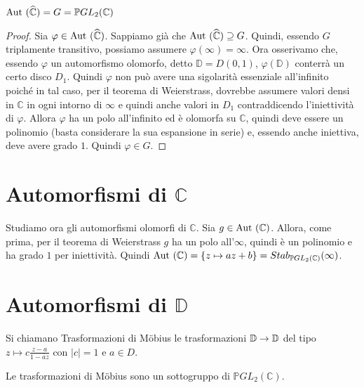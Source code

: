 \begin{proposizione}
$\text{Aut } (\widehat{\mathbb{C}} ) = G = \mathbb{P}GL_2 (\mathbb{C} )$
\end{proposizione}
\begin{proof}
Sia $\varphi \in \text{Aut } (\widehat{\mathbb{C}} )$. Sappiamo già che $\text{Aut } (\widehat{\mathbb{C}} ) \supseteq G$.
Quindi, essendo $G$ triplamente transitivo, possiamo assumere $\varphi( \infty ) = \infty$.
	Ora osserivamo che, essendo $\varphi$ un automorfismo olomorfo, detto $\mathbb{D} = D(0,1)$, $\varphi (\mathbb{D})$ conterrà
un certo disco $D_1$. Quindi $\varphi$ non può avere una sigolarità essenziale all'infinito poiché in tal caso,
per il teorema di Weierstrass, dovrebbe assumere valori densi in $\mathbb{C}$ in ogni intorno di $\infty$
e quindi anche valori in $D_1$ contraddicendo l'iniettività di $\varphi$.
Allora $\varphi$ ha un polo all'infinito ed è olomorfa su $\mathbb{C}$, quindi deve essere un polinomio (basta considerare la sua espansione in serie) e,
essendo anche iniettiva, deve avere grado $1$. Quindi $\varphi \in G$.
\end{proof}


\section{Automorfismi di $\mathbb{C}$}
Studiamo ora gli automorfismi olomorfi di $\mathbb{C}$.
Sia $g \in \text{Aut }(\mathbb{C})$. Allora, come prima, per il teorema di Weierstrass $g$ ha un polo all'$\infty$,
quindi è un polinomio e ha grado $1$ per iniettività. Quindi
$\text{Aut }(\mathbb{C} )= \left\{ z\mapsto az+b \right\} = Stab_{\mathbb{P} GL_2 (\mathbb{C})} (\infty )$.


\section{Automorfismi di $\mathbb{D}$}
\begin{definizione}
	Si chiamano Trasformazioni di Möbius le trasformazioni $\mathbb{D} \rightarrow \mathbb{D}$ del tipo $z\mapsto c \displaystyle{\frac{z-a}{1- \bar{a}z}}$ con $|c|=1$ e $a \in D$.
\end{definizione}


\begin{esercizio}
Le trasformazioni di Möbius sono un sottogruppo di $\mathbb{P} GL_2 (\mathbb{C})$.
\end{esercizio}


